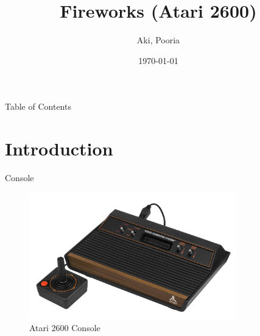 \documentclass{beamer}
\title[Title]{Fireworks (Atari 2600)}
\author{Aki, Pooria }
\institute[Metropolia UAS]{Metropolia University of Applied Sciences}
\date{\today}
\begin{document}
\begin{frame}
  \titlepage
\end{frame}

\begin{frame}{Table of Contents}
  \tableofcontents
\end{frame}


\section{Introduction}


%
%


\begin{frame}{Console}
    \begin{figure}
        \centering
        \includegraphics[width=0.8\textwidth]{atari2600.png} %
        \caption{Atari 2600 Console}
    \end{figure}
\end{frame}
\end{document}
